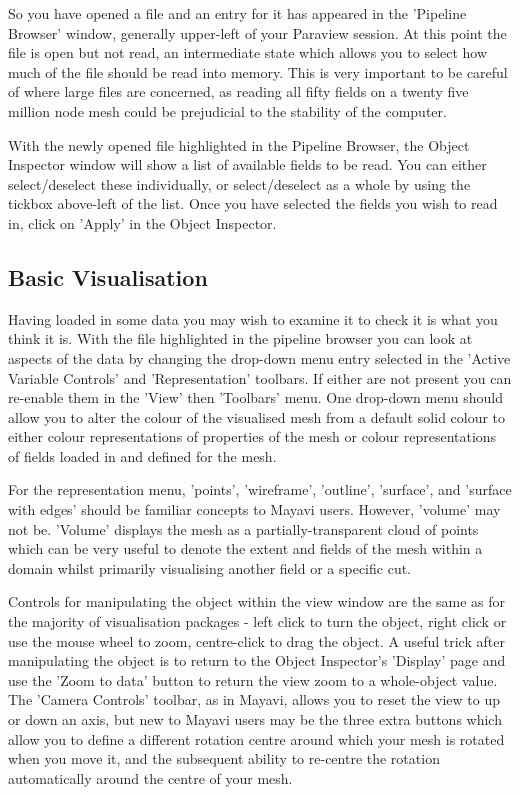 So you have opened a file and an entry for it has appeared in the 'Pipeline Browser' window, generally upper-left of your Paraview session. At this point the file is open but not read, an intermediate state which allows you to select how much of the file should be read into memory. This is very important to be careful of where large files are concerned, as reading all fifty fields on a twenty five million node mesh could be prejudicial to the stability of the computer. 

\begin{figure}[h!]
\label{paraview7}
  \centering
\end{figure}

With the newly opened file highlighted in the Pipeline Browser, the Object Inspector window will show a list of available fields to be read. You can either select/deselect these individually, or select/deselect as a whole by using the tickbox above-left of the list. Once you have selected the fields you wish to read in, click on 'Apply' in the Object Inspector. 

\subsection{Basic Visualisation}

Having loaded in some data you may wish to examine it to check it is what you think it is. With the file highlighted in the pipeline browser you can look at aspects of the data by changing the drop-down menu entry selected in the 'Active Variable Controls' and 'Representation' toolbars. If either are not present you can re-enable them in the 'View' then 'Toolbars' menu. One drop-down menu should allow you to alter the colour of the visualised mesh from a default solid colour to either colour representations of properties of the mesh or colour representations of fields loaded in and defined for the mesh.

For the representation menu, 'points', 'wireframe', 'outline', 'surface', and 'surface with edges' should be familiar concepts to Mayavi users. However, 'volume' may not be. 'Volume' displays the mesh as a partially-transparent cloud of points which can be very useful to denote the extent and fields of the mesh within a domain whilst primarily visualising another field or a specific cut.

Controls for manipulating the object within the view window are the same as for the majority of visualisation packages - left click to turn the object, right click or use the mouse wheel to zoom, centre-click to drag the object. A useful trick after manipulating the object is to return to the Object Inspector's 'Display' page and use the 'Zoom to data' button to return the view zoom to a whole-object value. The 'Camera Controls' toolbar, as in Mayavi, allows you to reset the view to up or down an axis, but new to Mayavi users may be the three extra buttons which allow you to define a different rotation centre around which your mesh is rotated when you move it, and the subsequent ability to re-centre the rotation automatically around the centre of your mesh. 

